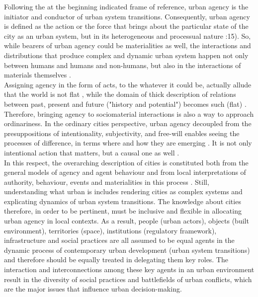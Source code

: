 \documentclass[11pt]{report}
\begin{document}
Following the at the beginning indicated frame of reference, urban agency is the initiator and conductor of urban system transitions.
Consequently, urban agency is defined as the action or the force that brings about the particular state of the city as an urban system, but in its heterogeneous and processual nature \cite{Farías (2011}:15). 
So, while bearers of urban agency could be materialities as well, the interactions and distributions that produce complex and dynamic urban system happen not only between humans and humans and non-humans, but also in the interactions of materials themselves \cite{Manuel De Landa (2011)}.
\\

Assigning agency in the form of acts, to the whatever it could be, actually allude that the world is not flat \cite{Roy 2009}, while the domain of thick description of relations between past, present and future ("history and potential") becomes such (flat) \cite{Rankin 2011}.
Therefore, bringing agency to sociomaterial interactions is also a way to approach ordinariness. In the ordinary cities perspective, urban agency decoupled from the presuppositions of intentionality, subjectivity, and free-will enables seeing the processes of difference, in terms where and how they are emerging \cite{Sayes 2014, McFarlane2011}.
It is not only intentional action that matters, but a causal one as well  
\cite{Sayes 2014}.
\\

In this respect, the overarching description of cities is constituted both from the general models of agency and agent behaviour and from local interpretations of authority, behaviour, events and materialities in this process \cite{Healey 1992}.
Still, understanding what urban is includes rendering cities as complex systems and explicating dynamics of urban  system transitions.
The knowledge about cities therefore, in order to be pertinent, must be inclusive and flexible in allocating urban agency in local contexts. 
As a result, people (urban actors), objects (built environment), territories (space), institutions (regulatory framework), infrastructure and social practices are all assumed to be equal agents in the dynamic process of contemporary urban development (urban system transitions) and therefore should be equally treated in delegating them key roles.
The interaction and interconnections among these key agents in an urban environment result in the diversity of social practices and battlefields of urban conflicts, which are the major issues that influence urban decision-making. 
\end{document}
